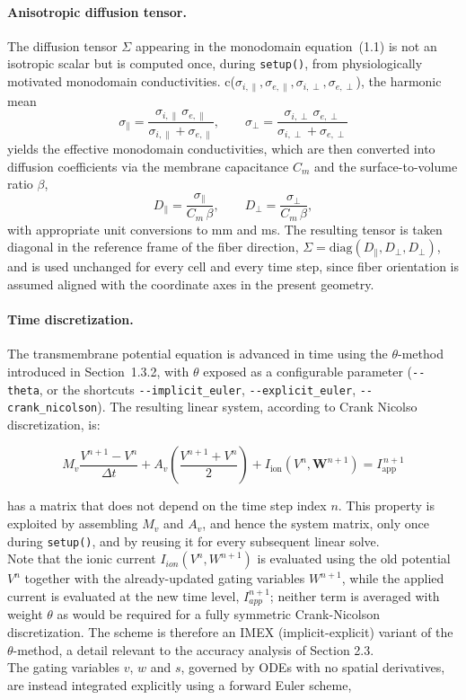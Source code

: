 \documentclass{Configuration_Files/PoliMi3i_thesis}
\begin{document}
\paragraph{Anisotropic diffusion tensor.}
The diffusion tensor $\Sigma$ appearing in the monodomain equation~(1.1) is not an
isotropic scalar but is computed once, during \texttt{setup()}, from physiologically
motivated monodomain conductivities. c($\sigma_{i,\parallel}, \sigma_{e,\parallel},
\sigma_{i,\perp}, \sigma_{e,\perp}$), the harmonic mean
\[
  \sigma_{\parallel} = \frac{\sigma_{i,\parallel}\,\sigma_{e,\parallel}}
  {\sigma_{i,\parallel}+\sigma_{e,\parallel}}, \qquad
  \sigma_{\perp} = \frac{\sigma_{i,\perp}\,\sigma_{e,\perp}}
  {\sigma_{i,\perp}+\sigma_{e,\perp}}
\]
yields the effective monodomain conductivities, which are then converted into diffusion
coefficients via the membrane capacitance $C_m$ and the surface-to-volume ratio $\beta$,
\[
  D_{\parallel} = \frac{\sigma_{\parallel}}{C_m\,\beta}, \qquad
  D_{\perp} = \frac{\sigma_{\perp}}{C_m\,\beta},
\]
with appropriate unit conversions to mm and ms. The resulting tensor is taken diagonal in
the reference frame of the fiber direction, $\Sigma = \mathrm{diag}(D_{\parallel},
D_{\perp}, D_{\perp})$, and is used unchanged for every cell and every time step, since
fiber orientation is assumed aligned with the coordinate axes in the present geometry.

\paragraph{Time discretization.}
The transmembrane potential equation is advanced in time using the $\theta$-method
introduced in Section~1.3.2, with $\theta$ exposed as a configurable parameter
(\texttt{-{}-theta}, or the shortcuts \texttt{-{}-implicit\_euler},
\texttt{-{}-explicit\_euler}, \texttt{-{}-crank\_nicolson}). The resulting linear system, according to Crank Nicolso discretization, is:

\[
M_v\frac{V^{n+1}-V^n}{\Delta t}
+
A_v\left(\frac{V^{n+1}+V^n}{2}\right)
+
I_{\mathrm{ion}}\!\left(V^n,\mathbf W^{n+1}\right)
=
I_{\mathrm{app}}^{\,n+1}
\]


has a matrix that does not depend on the time step index $n$. This property is exploited
by assembling $M_v$ and $A_v$, and hence the system matrix, only once during
\texttt{setup()}, and by reusing it for every subsequent linear solve.\\
Note that the ionic current $I_{ion}(V^n,W^{n+1})$
is evaluated using the old potential $V^n$ together with the already-updated
gating variables $W^{n+1}$, while the applied current is evaluated at the new
time level, $I_{app}^{n+1}$; neither term is averaged with weight $\theta$ as
would be required for a fully symmetric Crank-Nicolson discretization. The
scheme is therefore an IMEX (implicit-explicit) variant of the $\theta$-method,
a detail relevant to the accuracy analysis of Section 2.3.
\\The gating variables $v$, $w$ and $s$, governed by ODEs with no
spatial derivatives, are instead integrated explicitly using a forward Euler scheme,
\end{document}
